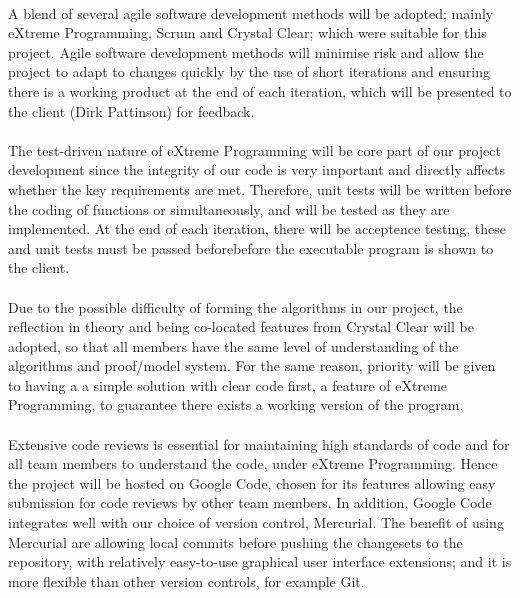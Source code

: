 \paragraph{}
A blend of several agile software development methods will be adopted; mainly eXtreme Programming, Scrum and Crystal Clear; which were suitable for this project. Agile software development methods will minimise risk and allow the project to adapt to changes quickly by the use of short iterations and ensuring there is a working product at the end of each iteration, which will be presented to the client (Dirk Pattinson) for feedback.

\paragraph{}
The test-driven nature of eXtreme Programming will be core part of our project development since the integrity of our code is very important and directly affects whether the key requirements are met. Therefore, unit tests will be written before the coding of functions or simultaneously, and will be tested as they are implemented. At the end of each iteration, there will be acceptence testing, these and unit tests must be passed beforebefore the executable program is shown to the client.

\paragraph{}
Due to the possible difficulty of forming the algorithms in our project, the reflection in theory and being co-located features from Crystal Clear will be adopted, so that all members have the same level of understanding of the algorithms and proof/model system. For the same reason, priority will be given to having a a simple solution with clear code first, a feature of eXtreme Programming, to guarantee there exists a working version of the program.

\paragraph{}
Extensive code reviews is essential for maintaining high standards of code and for all team members to understand the code, under eXtreme Programming. Hence the project will be hosted on Google Code, chosen for its features allowing easy submission for code reviews by other team members. In addition, Google Code integrates well with our choice of version control, Mercurial. The benefit of using Mercurial are allowing local commits before pushing the changesets to the repository, with relatively easy-to-use graphical user interface extensions; and it is more flexible than other version controls, for example Git.

